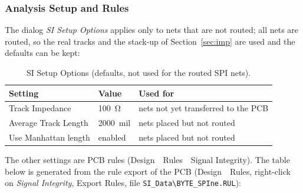 \documentclass[11pt,a4paper]{article}
\newcommand{\gui}[1]{\textsf{#1}}
\newcommand{\m}{\,\guillemotright\ }
\begin{document}
\subsubsection{Analysis Setup and Rules}

The dialog \textit{SI Setup Options} applies only to nets that are not routed; all nets are routed, so the
real tracks and the stack-up of Section~\ref{sec:imp} are used and the defaults can be kept:

\begin{table}[H]
\centering
\begin{tabular}{lll}
\toprule
Setting & Value & Used for \\
\midrule
Track Impedance & \qty{100}{\ohm} & nets not yet transferred to the PCB \\
Average Track Length & \qty{2000}{mil} & nets placed but not routed \\
Use Manhattan length & enabled & nets placed but not routed \\
\bottomrule
\end{tabular}
\caption{SI Setup Options (defaults, not used for the routed SPI nets).}
\label{tab:setup}
\end{table}

The other settings are PCB rules (\gui{Design \m Rules \m Signal Integrity}). The table below is
generated from the rule export of the PCB (\gui{Design \m Rules}, right-click on \textit{Signal Integrity},
\gui{Export Rules}, file \texttt{SI\_Data\textbackslash BYTE\_SPIne.RUL}):
\end{document}

